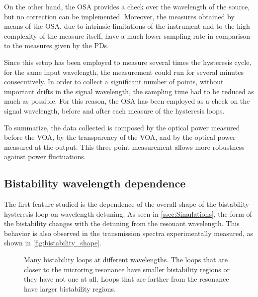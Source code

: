 On the other hand, the \ac{OSA} provides a check over the wavelength of the source, but no correction can be implemented.
Moreover, the measures obtained by means of the \ac{OSA}, due to intrinsic limitations of the instrument and to the high complexity of the measure itself, have a much lower sampling rate in comparison to the measures given by the \acp{PD}.

Since this setup has been employed to measure several times the hysteresis cycle, for the same input wavelength, the measurement could run for several minutes consecutively.
In order to collect a significant number of points, without important drifts in the signal wavelength, the sampling time had to be reduced as much as possible.
For this reason, the \ac{OSA} has been employed as a check on the signal wavelength, before and after each measure of the hysteresis loops.

To summarize, the data collected is composed by the optical power measured before the \ac{VOA}, by the transparency of the \ac{VOA}, and by the optical power measured at the output.
This three-point measurement allows more robustness against power fluctuations.


\subsection{Bistability wavelength dependence}
\label{ssec:bistability_wavelength_dependence}
The first feature studied is the dependence of the overall shape of the bistability hysteresis loop on wavelength detuning.
As seen in \autoref{ssec:Simulations}, the form of the bistability changes with the detuning from the resonant wavelength.
This behavior is also observed in the transmission spectra experimentally measured, as shown in \autoref{fig:bistability_shape}.

\begin{figure}[hbtp]
	\centering
	
	\caption{Many bistability loops at different wavelengths.
		The loops that are closer to the microring resonance have smaller bistability regions or they have not one at all.
		Loops that are farther from the resonance have larger bistability regions.}
	\label{fig:bistability_shape}
\end{figure}

